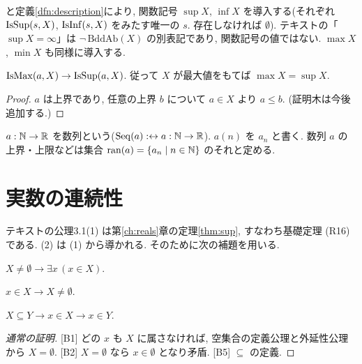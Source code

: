 \begin{dfn}
  [B3][B4] と定義\ref{dfn:description}により, 関数記号 $\sup X$, $\inf X$ を導入する(それぞれ $\mathrm{IsSup}(s,X)$, $\mathrm{IsInf}(s, X)$ をみたす唯一の $s$. 存在しなければ $\emptyset$). テキストの「$\sup X = \infty$」は $\neg\,\mathrm{BddAb}(X)$ の別表記であり, 関数記号の値ではない. $\max X$, $\min X$ も同様に導入する.
\end{dfn}

\begin{prop}
  $\mathrm{IsMax}(a, X) \to \mathrm{IsSup}(a, X)$. 従って $X$ が最大値をもてば $\max X = \sup X$.
\end{prop}
\begin{proof}
  $a$ は上界であり, 任意の上界 $b$ について $a \in X$ より $a \leq b$. (証明木は今後追加する.)
\end{proof}

\begin{dfn}
  $a : \mathbb{N} \to \mathbb{R}$ を数列という($\mathrm{Seq}(a) :\leftrightarrow a : \mathbb{N} \to \mathbb{R}$). $a(n)$ を $a_n$ と書く. 数列 $a$ の上界・上限などは集合 $\mathrm{ran}(a) = \{a_n \mid n \in \mathbb{N}\}$ のそれと定める.
\end{dfn}

\section{実数の連続性}

テキストの公理3.1(1) は第\ref{ch:reals}章の定理\ref{thm:sup}, すなわち基礎定理 (R16) である. (2) は (1) から導かれる. そのために次の補題を用いる.

\begin{lem}\label{lem:nonempty}
  \begin{enumerate}[label={[B\arabic*]}]
    \item $X \neq \emptyset \to \exists x\,(x \in X)$.
    \item $x \in X \to X \neq \emptyset$.
    \item[{[B5]}] $X \subseteq Y \to x \in X \to x \in Y$.
  \end{enumerate}
\end{lem}
\begin{proof}[通常の証明]
  [B1] どの $x$ も $X$ に属さなければ, 空集合の定義公理と外延性公理から $X = \emptyset$. [B2] $X = \emptyset$ なら $x \in \emptyset$ となり矛盾. [B5] $\subseteq$ の定義.
\end{proof}


